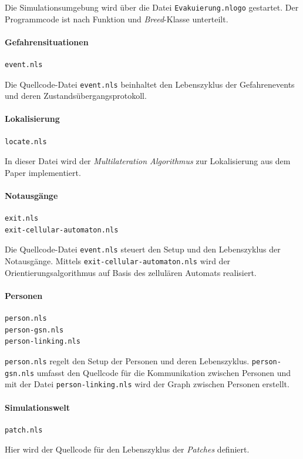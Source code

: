 Die Simulationsumgebung wird über die Datei \verb|Evakuierung.nlogo| gestartet. Der Programmcode ist nach Funktion und \emph{Breed}-Klasse unterteilt.

\paragraph{Gefahrensituationen} 

\begin{verbatim}
event.nls
\end{verbatim}

Die Quellcode-Datei \verb|event.nls| beinhaltet den Lebenszyklus der Gefahrenevents und deren Zustandsübergangsprotokoll. 

\paragraph{Lokalisierung}

\begin{verbatim}
locate.nls
\end{verbatim}

In dieser Datei wird der \emph{Multilateration Algorithmus} zur Lokalisierung aus dem Paper \cite{Jonathan.2004} implementiert.

\paragraph{Notausgänge}

\begin{verbatim}
exit.nls
exit-cellular-automaton.nls
\end{verbatim}

Die Quellcode-Datei \verb|event.nls| steuert den Setup und den Lebenszyklus der Notausgänge. Mittels \verb|exit-cellular-automaton.nls| wird der Orientierungsalgorithmus auf Basis des zellulären Automats realisiert.

\paragraph{Personen}

\begin{verbatim}
person.nls
person-gsn.nls
person-linking.nls
\end{verbatim}

\verb|person.nls| regelt den Setup der Personen und deren Lebenszyklus. \verb|person-gsn.nls| umfasst den Quellcode für die Kommunikation zwischen Personen und mit der Datei \verb|person-linking.nls| wird der Graph zwischen Personen erstellt.

\paragraph{Simulationswelt}

\begin{verbatim}
patch.nls
\end{verbatim}

Hier wird der Quellcode für den Lebenszyklus der \emph{Patches} definiert.